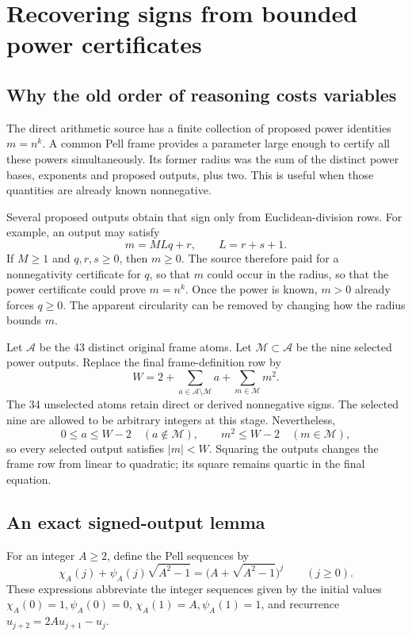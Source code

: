 \section{Recovering signs from bounded power certificates}\label{sec:signed}
\subsection{Why the old order of reasoning costs variables}

The direct arithmetic source has a finite collection of proposed power identities \(m=n^k\). A common Pell frame provides a parameter large enough to certify all these powers simultaneously. Its former radius was the sum of the distinct power bases, exponents and proposed outputs, plus two. This is useful when those quantities are already known nonnegative.

Several proposed outputs obtain that sign only from Euclidean-division rows. For example, an output may satisfy
\[
m=M Lq+r,\qquad L=r+s+1.
\]
If \(M\ge1\) and \(q,r,s\ge0\), then \(m\ge0\). The source therefore paid for a nonnegativity certificate for \(q\), so that \(m\) could occur in the radius, so that the power certificate could prove \(m=n^k\). Once the power is known, \(m>0\) already forces \(q\ge0\). The apparent circularity can be removed by changing how the radius bounds \(m\).

Let \(\mathcal A\) be the 43 distinct original frame atoms. Let \(\mathcal M\subset\mathcal A\) be the nine selected power outputs. Replace the final frame-definition row by
\begin{equation}\label{eq:newradius}
\boxed{W=2+\sum_{a\in\mathcal A\setminus\mathcal M}a+
\sum_{m\in\mathcal M}m^2.}
\end{equation}
The 34 unselected atoms retain direct or derived nonnegative signs. The selected nine are allowed to be arbitrary integers at this stage. Nevertheless,
\[
0\le a\le W-2\quad(a\notin\mathcal M),\qquad
m^2\le W-2\quad(m\in\mathcal M),
\]
so every selected output satisfies \(|m|<W\). Squaring the outputs changes the frame row from linear to quadratic; its square remains quartic in the final equation.

\subsection{An exact signed-output lemma}

For an integer \(A\ge2\), define the Pell sequences by
\[
\chi_A(j)+\psi_A(j)\sqrt{A^2-1}
=\bigl(A+\sqrt{A^2-1}\bigr)^j\qquad(j\ge0).
\]
These expressions abbreviate the integer sequences given by the initial values \(\chi_A(0)=1,\psi_A(0)=0\), \(\chi_A(1)=A,\psi_A(1)=1\), and recurrence \(u_{j+2}=2Au_{j+1}-u_j\).

